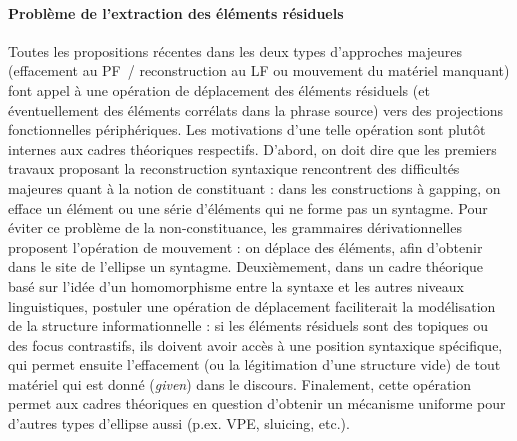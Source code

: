 \paragraph[Problème de l'extraction des éléments résiduels ]{Problème de l'extraction des éléments résiduels} 
\label{bkm:Ref289439559}Toutes les propositions récentes dans les deux types d'approches majeures (effacement au PF~/ reconstruction au LF ou mouvement du matériel manquant) font appel à une opération de déplacement des éléments résiduels (et éventuellement des éléments corrélats dans la phrase source) vers des projections fonctionnelles périphériques. Les motivations d'une telle opération sont plutôt internes aux cadres théoriques respectifs. D'abord, on doit dire que les premiers travaux proposant la reconstruction syntaxique rencontrent des difficultés majeures quant à la notion de constituant : dans les constructions à gapping, on efface un élément ou une série d'éléments qui ne forme pas un syntagme. Pour éviter ce problème de la non-constituance, les grammaires dérivationnelles proposent l'opération de mouvement : on déplace des éléments, afin d'obtenir dans le site de l'ellipse un syntagme. Deuxièmement, dans un cadre théorique basé sur l'idée d'un homomorphisme entre la syntaxe et les autres niveaux linguistiques, postuler une opération de déplacement faciliterait la modélisation de la structure informationnelle : si les éléments résiduels sont des topiques ou des focus contrastifs, ils doivent avoir accès à une position syntaxique spécifique, qui permet ensuite l'effacement (ou la légitimation d'une structure vide) de tout matériel qui est donné (\textit{given}) dans le discours. Finalement, cette opération permet aux cadres théoriques en question d'obtenir un mécanisme uniforme pour d'autres types d'ellipse aussi (p.ex. VPE, sluicing, etc.).

